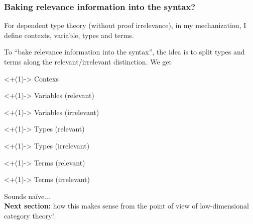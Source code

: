 \begin{frame}
  \frametitle{Baking relevance information into the syntax?}

  \pause For dependent type theory (without proof irrelevance), in my
  mechanization, I define contexts, variable, types and terms.

  \pause To ``bake relevance information into the syntax'', the idea is to
  split types and terms along the relevant/irrelevant distinction. We get
  \begin{tightitemize}
    \item<+(1)-> Contexs
    \item<+(1)-> Variables (relevant)
    \item<+(1)-> Variables (irrelevant)
    \item<+(1)-> Types (relevant)
    \item<+(1)-> Types (irrelevant)
    \item<+(1)-> Terms (relevant)
    \item<+(1)-> Terms (irrelevant)
  \end{tightitemize}

  \pause Sounds naïve... \\
  \textbf{Next section:} how this makes sense from the point of
  view of low-dimensional category theory!
\end{frame}

